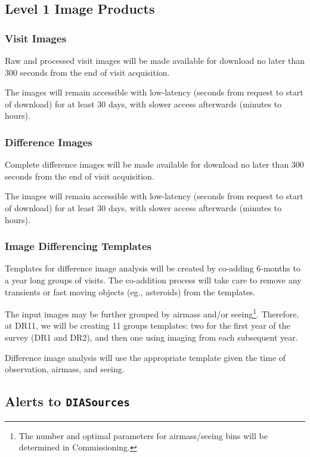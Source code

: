 \documentclass[12pt]{article}
\newcommand{\code}[1]{\texttt{#1}}
\newcommand{\DIASources}{\code{DIASources}\xspace}
\begin{document}
\subsection{Level 1 Image Products}

\subsubsection{Visit Images}

Raw and processed visit images will be made available for download no later
than 300 seconds from the end of visit acquisition.

The images will remain accessible with low-latency (seconds from request to
start of download) for at least 30 days, with slower access afterwards
(minutes to hours).

\subsubsection{Difference Images}
\label{sec:diffims}

Complete difference images will be made available for download no later than
300 seconds from the end of visit acquisition.

The images will remain accessible with low-latency (seconds from request to
start of download) for at least 30 days, with slower access afterwards
(minutes to hours).

\subsubsection{Image Differencing Templates}
\label{sec:templates}

Templates for difference image analysis will be created by co-adding 6-months
to a year long groups of visits. The co-addition process will take care to
remove any transients or fast moving objects (eg., asteroids) from the
templates.

The input images may be further grouped by airmass and/or seeing\footnote{The
number and optimal parameters for airmass/seeing bins will be determined in
Commissioning.}. Therefore, at DR11, we will be creating 11 groups templates:
two for the first year of the survey (DR1 and DR2), and then one using imaging
from each subsequent year.

Difference image analysis will use the appropriate template given the time of
observation, airmass, and seeing.

\subsection{Alerts to \DIASources}
\label{sec:voEventContents}
\end{document}
